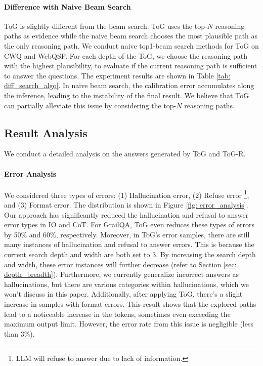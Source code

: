 \documentclass{article} %
\begin{document}
\paragraph{Difference with Naive Beam Search}
ToG is slightly different from the beam search. ToG uses the top-$N$ reasoning paths as evidence while the naive beam search chooses the most plausible path as the only reasoning path. We conduct naive top1-beam search methods for ToG on CWQ and WebQSP. For each depth of the ToG, we choose the reasoning path with the highest plausibility, to evaluate if the current reasoning path is sufficient to answer the questions. The experiment results are shown in Table \ref{tab: diff_search_algo}. In naive beam search, the calibration error accumulates along the inference, leading to the instability of the final result.
We believe that ToG can partially alleviate this issue by considering the top-$N$ reasoning paths.



\subsection{Result Analysis}\label{sec: analysis}
We conduct a detailed analysis on the answers generated by ToG and ToG-R.

\paragraph{Error Analysis}
We considered three types of errors: (1) Hallucination error, (2) Refuse error \footnote{LLM will refuse to answer due to lack of information.}, and (3) Format error. The distribution is shown in Figure \ref{fig: error_analysis}. Our approach has significantly reduced the hallucination and refusal to answer error types in IO and CoT. For GrailQA, ToG even reduces these types of errors by 50\% and 60\%, respectively. Moreover, in ToG's error samples, there are still many instances of hallucination and refusal to answer errors. This is because the current search depth and width are both set to 3. By increasing the search depth and width, these error instances will further decrease (refer to Section \ref{sec: depth_breadth}). Furthermore, we currently generalize incorrect answers as hallucinations, but there are various categories within hallucinations, which we won't discuss in this paper. Additionally, after applying ToG, there's a slight increase in samples with format errors. This result shows that the explored paths lead to a noticeable increase in the tokens, sometimes even exceeding the maximum output limit. However, the error rate from this issue is negligible (less than 3\%).
\end{document}
